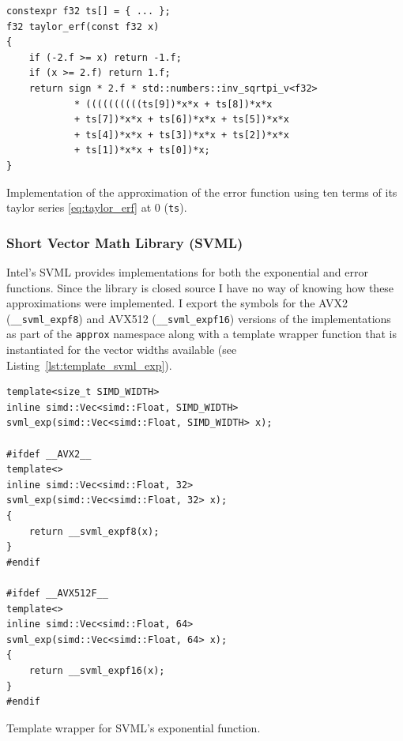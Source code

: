 \documentclass[a4paper, 11pt]{memoir}
\begin{document}
    \begin{listing}[t]
        \begin{verbatim}
constexpr f32 ts[] = { ... };
f32 taylor_erf(const f32 x)
{
    if (-2.f >= x) return -1.f;
    if (x >= 2.f) return 1.f;
    return sign * 2.f * std::numbers::inv_sqrtpi_v<f32>
            * ((((((((((ts[9])*x*x + ts[8])*x*x
            + ts[7])*x*x + ts[6])*x*x + ts[5])*x*x
            + ts[4])*x*x + ts[3])*x*x + ts[2])*x*x
            + ts[1])*x*x + ts[0])*x;
}
        \end{verbatim}
        \caption{Implementation of the approximation of the error function using ten terms of its taylor series \eqref{eq:taylor_erf} at $0$ (\texttt{ts}).}
        \label{lst:horner_taylor}
    \end{listing}

    \subsubsection{Short Vector Math Library (SVML)}
    \label{sec:svml}
    Intel's SVML provides implementations for both the exponential and error functions. Since the library is closed
    source I have no way of knowing how these approximations were implemented. I export the symbols for the AVX2
    (\texttt{__svml_expf8}) and AVX512 (\texttt{__svml_expf16}) versions of the implementations as part of
    the \texttt{approx} namespace along with a template wrapper function that is instantiated for the vector
    widths available (see Listing~\ref{lst:template_svml_exp}).

    \begin{listing}[t]
        \begin{verbatim}
template<size_t SIMD_WIDTH>
inline simd::Vec<simd::Float, SIMD_WIDTH>
svml_exp(simd::Vec<simd::Float, SIMD_WIDTH> x);

#ifdef __AVX2__
template<>
inline simd::Vec<simd::Float, 32>
svml_exp(simd::Vec<simd::Float, 32> x);
{
    return __svml_expf8(x);
}
#endif

#ifdef __AVX512F__
template<>
inline simd::Vec<simd::Float, 64>
svml_exp(simd::Vec<simd::Float, 64> x);
{
    return __svml_expf16(x);
}
#endif
        \end{verbatim}
        \caption{Template wrapper for SVML's exponential function.}
        \label{lst:template_svml_exp}
    \end{listing}
\end{document}

